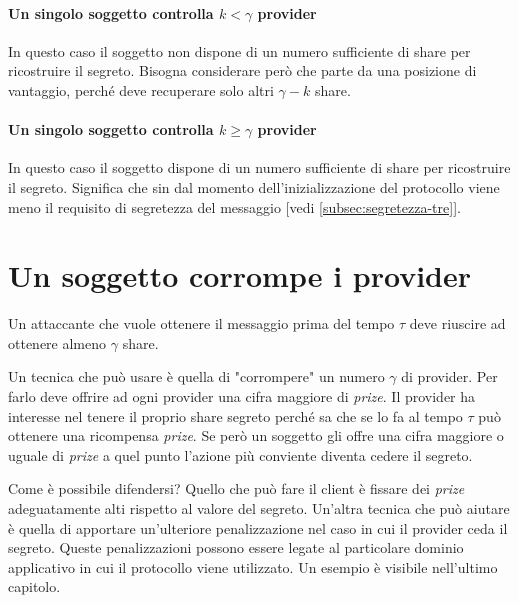 \paragraph{Un singolo soggetto controlla $ k < \gamma $ provider}
In questo caso il soggetto non dispone di un numero sufficiente di share per
ricostruire il segreto. Bisogna considerare però che parte da una posizione di
vantaggio, perché deve recuperare solo altri $ \gamma - k $ share.
\paragraph{Un singolo soggetto controlla $ k \geq \gamma $ provider}
In questo caso il soggetto dispone di un numero sufficiente di share per
ricostruire il segreto. Significa che sin dal momento dell'inizializzazione
del protocollo viene meno il requisito di
segretezza del messaggio [vedi \ref{subsec:segretezza-tre}].


\section{Un soggetto corrompe i provider}
Un attaccante che vuole ottenere il messaggio prima del tempo $ \tau $ deve riuscire
ad ottenere almeno $ \gamma $ share.

Un tecnica che può usare è quella di "corrompere" un numero $ \gamma $ di provider.
Per farlo deve offrire ad ogni provider una cifra maggiore di \textit{prize}.
Il provider ha interesse nel tenere il proprio share segreto perché sa che se lo fa
al tempo $ \tau $ può ottenere una ricompensa \textit{prize}.
Se però un soggetto gli
offre una cifra maggiore o uguale di \textit{prize} a quel punto l'azione
più conviente diventa cedere il segreto.

Come è possibile difendersi? Quello che può fare il client è fissare dei
\textit{prize} adeguatamente alti rispetto al valore del segreto.
Un'altra tecnica che può aiutare è quella di
apportare un'ulteriore penalizzazione nel
caso in cui il provider ceda il segreto. Queste penalizzazioni possono essere
legate al particolare dominio applicativo in cui il protocollo viene utilizzato.
Un esempio è visibile nell'ultimo capitolo.